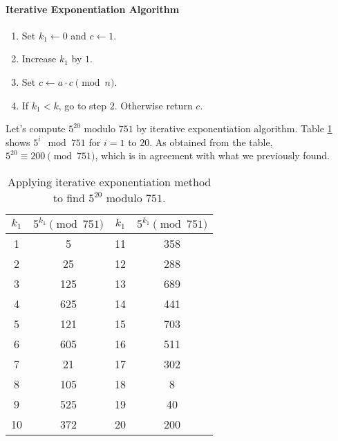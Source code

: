 \documentclass{subfile}
\begin{document}
	\paragraph{Iterative Exponentiation Algorithm}
	\begin{enumerate}[1.]
		\item Set $k_1 \longleftarrow 0$ and $c \longleftarrow 1$.
		\item Increase $k_1$ by $1$.
		\item Set $c \longleftarrow a \cdot c \pmod n$.
		\item If $k_1<k$, go to step $2$. Otherwise return $c$.
	\end{enumerate}

	\begin{example}
		Let's compute $5^{20}$ modulo $751$ by iterative exponentiation algorithm. Table \ref{table:modmult} shows $5^i \mod{751}$ for $i=1$ to $20$. As obtained from the table, $5^{20} \equiv 200 \pmod{751}$, which is in agreement with what we previously found.
		\begin{table}
			\centering
			\begin{tabular}{|c|c|c|c|}
				\hline
				$k_1$ & $5^{k_1} \pmod{751}$ & $k_1$ & $5^{k_1} \pmod{751}$ \\
				\hline
				1 & 5 & 11 & 358  \\
				\hline
				2 & 25 & 12 & 288 \\
				\hline
				3 & 125 & 13 & 689 \\
				\hline
				4 & 625 & 14 & 441  \\
				\hline
				5 & 121 & 15 & 703 \\
				\hline
				6 & 605 & 16 & 511 \\
				\hline
				7 & 21 & 17 & 302 \\
				\hline
				8 & 105 & 18 & 8 \\
				\hline
				9 & 525 & 19 & 40 \\
				\hline
				10 & 372 & 20 & 200 \\
				\hline
			\end{tabular}
			\caption{Applying iterative exponentiation method to find $5^{20}$ modulo $751$.}
			\label{table:modmult}
		\end{table}
	\end{example}
\end{document}
